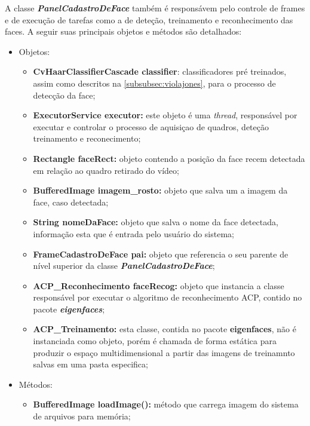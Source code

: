 A classe \textbf{\textit{PanelCadastroDeFace}} também é responsávem pelo controle de frames e de execução de tarefas como a de deteção, treinamento e reconhecimento das faces. A seguir suas principais objetos e métodos são detalhados:

\begin{itemize}
	\item Objetos:
	\begin{itemize}
		\item \textbf{CvHaarClassifierCascade classifier}: classificadores pré treinados, assim como descritos na \autoref{subsubsec:violajones}, para o processo de detecção da face;
		
		\item \textbf{ExecutorService executor:} este objeto é uma \textit{thread}, responsável por executar e controlar o processo de aquisiçao de quadros, deteção treinamento e reconecimento;
		
		\item \textbf{Rectangle faceRect:} objeto contendo a posição da face recem detectada em relação ao quadro retirado do vídeo;
		
		\item \textbf{BufferedImage imagem\_rosto:} objeto que salva um a imagem da face, caso detectada;
		
		\item \textbf{String nomeDaFace:} objeto que salva o nome da face detectada, informação esta que é entrada pelo usuário do sistema;
		
		\item \textbf{FrameCadastroDeFace pai:} objeto que referencia o seu parente de nível superior da classe \textbf{\textit{PanelCadastroDeFace}};
		
		\item \textbf{ACP\_Reconhecimento faceRecog:} objeto que instancia a classe responsável por executar o algoritmo de reconhecimento ACP, contido no pacote \textbf{\textit{eigenfaces}};
		
		\item \textbf{ACP\_Treinamento:} esta classe, contida no pacote \textbf{eigenfaces}, não é instanciada como objeto, porém é chamada de forma estática para produzir o espaço multidimensional a partir das imagens de treinamnto salvas em uma pasta especifica;
		
	\end{itemize}
	
	\item Métodos:
	\begin{itemize}
		\item \textbf{BufferedImage loadImage():} método que carrega imagem do sistema de arquivos para memória;
		

\end{itemize}
\end{itemize}
